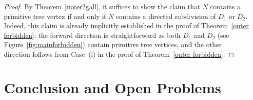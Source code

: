 \documentclass[pdflatex,sn-mathphys-num]{sn-jnl}
\theoremstyle{thmstyleone}%
\theoremstyle{thmstyletwo}%
\theoremstyle{thmstylethree}%
\begin{document}
\begin{proof}
By Theorem~\ref{noter2gall}, it suffices to show the claim that $N$ contains a primitive tree vertex if and only if $N$ contains a directed subdivision of $D_1$ or $D_2$. Indeed, this claim is already implicitly established in the proof of Theorem~\ref{outer forbidden}: the forward direction is straightforward as both $D_1$ and $D_2$ (see Figure~\ref{fig:mainforbidden}) contain primitive tree vertices, and the other direction follows from Case~(i) in the proof of Theorem~\ref{outer forbidden}.
\end{proof}
































































\section{Conclusion and Open Problems} \label{sec:conclusion}
\end{document}

